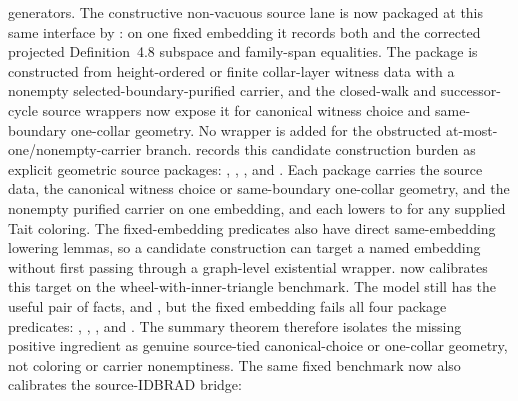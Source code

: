 \documentclass[11pt]{article}
\begin{document}
generators.  The constructive non-vacuous source lane is now packaged at this
same interface by
: on one fixed embedding
it records both  and the corrected
projected Definition~4.8 subspace and family-span equalities.  The package is
constructed from height-ordered or finite collar-layer witness data with a
nonempty selected-boundary-purified carrier, and the closed-walk and
successor-cycle source wrappers now expose it for canonical witness choice and
same-boundary one-collar geometry.  No wrapper is added for the obstructed
at-most-one/nonempty-carrier branch.
 records this candidate
construction burden as explicit geometric source packages:
,
,
, and
.  Each package carries
the source data, the canonical witness choice or same-boundary one-collar
geometry, and the nonempty purified carrier on one embedding, and each lowers
to  for any supplied Tait
coloring.  The fixed-embedding predicates also have direct same-embedding
lowering lemmas, so a candidate construction can target a named embedding
without first passing through a graph-level existential wrapper.
 now calibrates this
target on the wheel-with-inner-triangle benchmark.  The model still has the
useful pair of facts,  and
,
but the fixed embedding fails all four package predicates:
,
,
,
and
.
The summary theorem
therefore isolates the missing positive ingredient as genuine source-tied
canonical-choice or one-collar geometry, not coloring or carrier nonemptiness.
The same fixed benchmark now also calibrates the source-IDBRAD bridge:
\end{document}
